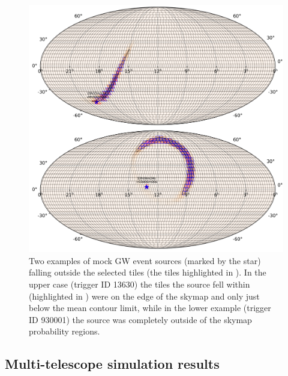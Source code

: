\begin{colsection}
\begin{colsection}
\begin{figure}[p]
    \begin{center}
        \includegraphics[width=\linewidth]{images/non_selected.pdf} %
    \end{center}
    \caption[Examples of mock GW event sources falling outside of the selected tiles]{
        Two examples of mock GW event sources (marked by the star) falling outside the selected tiles (the tiles highlighted in ). In the upper case (trigger ID 13630) the tiles the source fell within (highlighted in ) were on the edge of the skymap and only just below the mean contour limit, while in the lower example (trigger ID 930001) the source was completely outside of the skymap probability regions.
    }\label{fig:poor_selection}
\end{figure}

\clearpage

\end{colsection}


\subsection{Multi-telescope simulation results}
\label{sec:gw_sim_results}
\begin{colsection}


\end{colsection}
\end{colsection}
